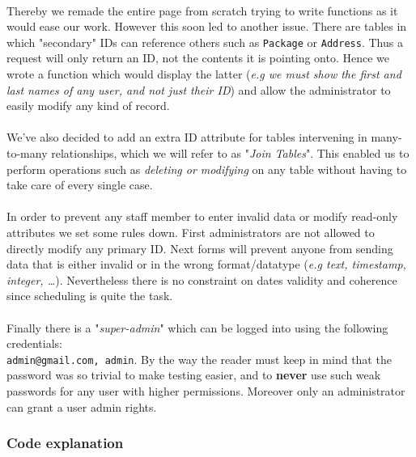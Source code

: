 \documentclass[11pt,a4paper,titlepage]{article}
\begin{document}
\paragraph{}
Thereby we remade the entire page from scratch trying to write functions as it would ease our work. However this soon led to another issue. There are tables in which "secondary" IDs can reference others such as \verb|Package| or \verb|Address|. Thus a request will only return an ID, not the contents it is pointing onto. Hence we wrote a function which would display the latter (\textit{e.g we must show the first and last names of any user, and not just their ID}) and allow the administrator to easily modify any kind of record.
\paragraph{}
We've also decided to add an extra ID attribute for tables intervening in many-to-many relationships, which we will refer to as "\textit{Join Tables}". This enabled us to perform operations such as \textit{deleting or modifying} on any table without having to take care of every single case.
\paragraph{}
In order to prevent any staff member to enter invalid data or modify read-only attributes we set some rules down. First administrators are not allowed to directly modify any primary ID. Next forms will prevent anyone from sending data that is either invalid or in the wrong format/datatype (\textit{e.g text, timestamp, integer, \ldots}). Nevertheless there is no constraint on dates validity and coherence since scheduling is quite the task.
\paragraph{}
Finally there is a "\textit{super-admin}" which can be logged into using the following credentials:\\\verb|admin@gmail.com, admin|. By the way the reader must keep in mind that the password was so trivial to make testing easier, and to \textbf{never} use such weak passwords for any user with higher permissions. Moreover only an administrator can grant a user admin rights. 

\subsubsection{Code explanation}
\end{document}
